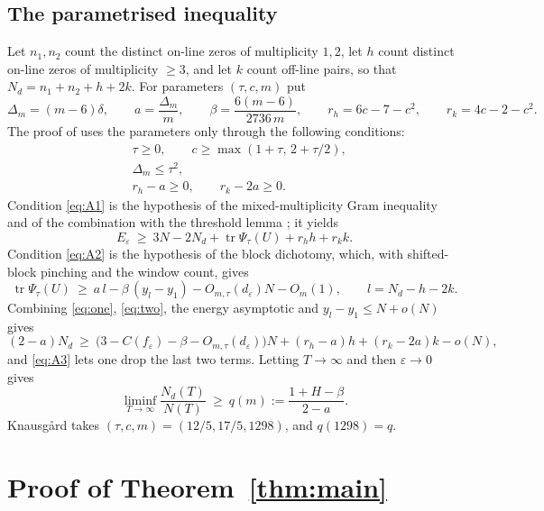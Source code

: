 \documentclass[reqno,11pt]{amsart}
\numberwithin{equation}{section}
\theoremstyle{plain}
\theoremstyle{remark}
\newcommand{\eps}{\varepsilon}
\DeclareMathOperator{\tr}{tr}
\begin{document}
\subsection*{The parametrised inequality}
Let $n_1,n_2$ count the distinct on-line zeros of multiplicity $1,2$, let $h$
count distinct on-line zeros of multiplicity $\ge3$, and let $k$ count
off-line pairs, so that $N_d=n_1+n_2+h+2k$. For parameters $(\tau,c,m)$ put
\[
\Delta_m=(m-6)\delta,\qquad a=\frac{\Delta_m}{m},\qquad
\beta=\frac{6(m-6)}{2736\,m},\qquad r_h=6c-7-c^2,\qquad r_k=4c-2-c^2 .
\]
The proof of \cite[Theorem 1]{Kna26} uses the parameters only through the
following conditions:
\begin{align}
&\tau\ge0,\qquad c\ge\max(1+\tau,\,2+\tau/2), \label{eq:A1}\\
&\Delta_m\le\tau^2, \label{eq:A2}\\
&r_h-a\ge0,\qquad r_k-2a\ge0. \label{eq:A3}
\end{align}
Condition \eqref{eq:A1} is the hypothesis of the mixed-multiplicity Gram
inequality \cite[Theorem 2]{Kna26} and of the combination with the threshold
lemma \cite[Lemma 4]{Kna26}; it yields
\begin{equation}\label{eq:one}
E_\eps\ \ge\ 3N-2N_d+\tr\Psi_\tau(U)+r_hh+r_kk .
\end{equation}
Condition \eqref{eq:A2} is the hypothesis of the block dichotomy, which, with
shifted-block pinching and the window count, gives
\begin{equation}\label{eq:two}
\tr\Psi_\tau(U)\ \ge\ a\,l-\beta\,(y_l-y_1)-O_{m,\tau}(d_\eps)N-O_m(1),
\qquad l=N_d-h-2k .
\end{equation}
Combining \eqref{eq:one}, \eqref{eq:two}, the energy asymptotic and
$y_l-y_1\le N+o(N)$ gives
\begin{equation}\label{eq:final}
(2-a)N_d\ \ge\ \bigl(3-C(f_\eps)-\beta-O_{m,\tau}(d_\eps)\bigr)N+(r_h-a)h+(r_k-2a)k-o(N),
\end{equation}
and \eqref{eq:A3} lets one drop the last two terms. Letting $T\to\infty$ and
then $\eps\to0$ gives
\begin{equation}\label{eq:qm}
\liminf_{T\to\infty}\frac{N_d(T)}{N(T)}\ \ge\ q(m):=\frac{1+H-\beta}{2-a}.
\end{equation}
Knausg{\aa}rd takes $(\tau,c,m)=(12/5,17/5,1298)$, and $q(1298)=q$.

\section{Proof of Theorem~\ref{thm:main}}
\end{document}
